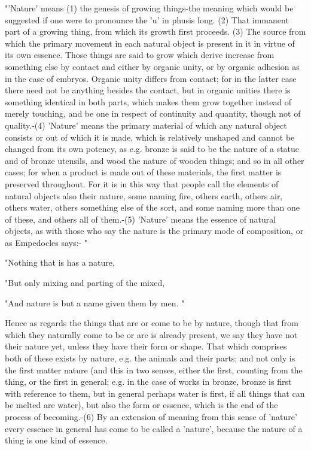 "'Nature' means (1) the genesis of growing things-the meaning which
would be suggested if one were to pronounce the 'u' in phusis long.
(2) That immanent part of a growing thing, from which its growth first
proceeds. (3) The source from which the primary movement in each natural
object is present in it in virtue of its own essence. Those things
are said to grow which derive increase from something else by contact
and either by organic unity, or by organic adhesion as in the case
of embryos. Organic unity differs from contact; for in the latter
case there need not be anything besides the contact, but in organic
unities there is something identical in both parts, which makes them
grow together instead of merely touching, and be one in respect of
continuity and quantity, though not of quality.-(4) 'Nature' means
the primary material of which any natural object consists or out of
which it is made, which is relatively unshaped and cannot be changed
from its own potency, as e.g. bronze is said to be the nature of a
statue and of bronze utensils, and wood the nature of wooden things;
and so in all other cases; for when a product is made out of these
materials, the first matter is preserved throughout. For it is in
this way that people call the elements of natural objects also their
nature, some naming fire, others earth, others air, others water,
others something else of the sort, and some naming more than one of
these, and others all of them.-(5) 'Nature' means the essence of natural
objects, as with those who say the nature is the primary mode of composition,
or as Empedocles says:- "

"Nothing that is has a nature, 

"But only mixing and parting of the mixed, 

"And nature is but a name given them by men. "

Hence as regards the things that are or come to be by nature, though
that from which they naturally come to be or are is already present,
we say they have not their nature yet, unless they have their form
or shape. That which comprises both of these exists by nature, e.g.
the animals and their parts; and not only is the first matter nature
(and this in two senses, either the first, counting from the thing,
or the first in general; e.g. in the case of works in bronze, bronze
is first with reference to them, but in general perhaps water is first,
if all things that can be melted are water), but also the form or
essence, which is the end of the process of becoming.-(6) By an extension
of meaning from this sense of 'nature' every essence in general has
come to be called a 'nature', because the nature of a thing is one
kind of essence. 

